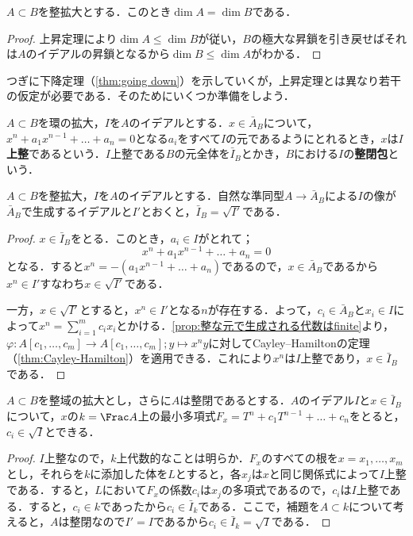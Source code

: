 \begin{cor}
	$A\subset B$を整拡大とする．このとき$\dim A=\dim B$である．
\end{cor}

\begin{proof}
	上昇定理により$\dim A\leq\dim B$が従い，$B$の極大な昇鎖を引き戻せばそれは$A$のイデアルの昇鎖となるから$\dim B\leq\dim A$がわかる．
\end{proof}

つぎに下降定理（\ref{thm:going down}）を示していくが，上昇定理とは異なり若干の仮定が必要である．そのためにいくつか準備をしよう．

\begin{defi}
	$A\subset B$を環の拡大，$I$を$A$のイデアルとする．$x\in\bar{A}_B$について，$x^n+a_1x^{n-1}+\dots+a_n=0$となる$a_i$をすべて$I$の元であるようにとれるとき，$x$は$I$\textbf{上整}であるという．$I$上整である$B$の元全体を$\bar{I}_B$とかき，$B$における$I$の\textbf{整閉包}という．
\end{defi}

\begin{lem}\label{lem:イデアルの整閉包と根基}
	$A\subset B$を整拡大，$I$を$A$のイデアルとする．自然な準同型$A\to \bar{A}_B$による$I$の像が$\bar{A}_B$で生成するイデアルと$I'$とおくと，$\bar{I}_B=\sqrt{I'}$である．
\end{lem}

\begin{proof}
	$x\in\bar{I}_B$をとる．このとき，$a_i\in I$がとれて；
	\[x^n+a_1x^{n-1}+\dots+a_n=0\]
	となる．すると$x^n=-(a_1x^{n-1}+\dots+a_n)$であるので，$x\in\bar{A}_B$であるから$x^n\in I'$すなわち$x\in\sqrt{I'}$である．
	
	一方，$x\in\sqrt{I'}$とすると，$x^n\in I'$となる$n$が存在する．よって，$c_i\in\bar{A}_B$と$x_i\in I$によって$x^n=\sum_{i=1}^m c_ix_i$とかける．\ref{prop:整な元で生成される代数はfinite}より，$\varphi:A[c_1,\dots,c_m]\to A[c_1,\dots,c_m];y\mapsto x^ny$に対してCayley--Hamiltonの定理（\ref{thm:Cayley-Hamilton}）を適用できる．これにより$x^n$は$I$上整であり，$x\in\bar{I}_B$である．
\end{proof}

\begin{prop}\label{prop:整なら最小多項式が根基からとれる}
	$A\subset B$を整域の拡大とし，さらに$A$は整閉であるとする．$A$のイデアル$I$と$x\in\bar{I}_B$について，$x$の$k=\Frac A$上の最小多項式$F_x=T^n+c_1T^{n-1}+\dots+c_n$をとると，$c_i\in\sqrt{I}$とできる．
\end{prop}

\begin{proof}
	$I$上整なので，$k$上代数的なことは明らか．$F_x$のすべての根を$x=x_1,\dots,x_m$とし，それらを$k$に添加した体を$L$とすると，各$x_j$は$x$と同じ関係式によって$I$上整である．すると，$L$において$F_x$の係数$c_i$は$x_j$の多項式であるので，$c_i$は$I$上整である．すると，$c_i\in k$であったから$c_i\in\bar{I}_k$である．ここで，補題を$A\subset k$について考えると，$A$は整閉なので$I'=I$であるから$c_i\in\bar{I}_k=\sqrt{I}$である．
\end{proof}

